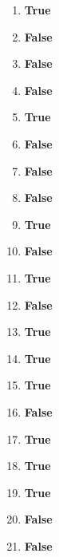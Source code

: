 \documentclass[11pt,oneside]{article}
\begin{document}
\begin{enumerate}[label=\textbf{Q\arabic*.}, leftmargin=3em, itemsep=4pt]
  \item \textbf{True}
  \item \textbf{False}
  \item \textbf{False}
  \item \textbf{False}
  \item \textbf{True}
  \item \textbf{False}
  \item \textbf{False}
  \item \textbf{False}
  \item \textbf{True}
  \item \textbf{False}
  \item \textbf{True}
  \item \textbf{False}
  \item \textbf{True}
  \item \textbf{True}
  \item \textbf{True}
  \item \textbf{False}
  \item \textbf{True}
  \item \textbf{True}
  \item \textbf{True}
  \item \textbf{False}
  \item \textbf{False}

\end{enumerate}
\end{document}
